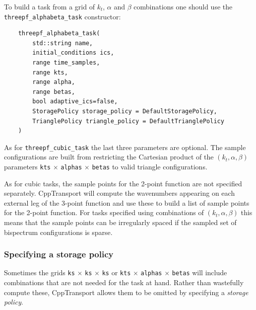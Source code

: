 \documentclass[11pt,a4paper]{article}
\newcommand{\packagefont}{\sffamily}
\newcommand{\CppTransport}{{\packagefont CppTransport}}
\begin{document}
To build a task from a grid of $k_t$, $\alpha$ and $\beta$ combinations one should use
the \texttt{threepf_alphabeta_task} constructor:
\begin{verbatim}
    threepf_alphabeta_task(
        std::string name,
        initial_conditions ics,
        range time_samples,
        range kts,
        range alpha,
        range betas,
        bool adaptive_ics=false,
        StoragePolicy storage_policy = DefaultStoragePolicy,
        TrianglePolicy triangle_policy = DefaultTrianglePolicy
    )    
\end{verbatim}
As for \texttt{threepf_cubic_task} the last three parameters are optional.
The sample configurations are built from restricting the Cartesian product
of the $(k_t, \alpha, \beta)$ parameters
\texttt{kts} $\times$ \texttt{alphas} $\times$ \texttt{betas}
to valid triangle configurations.

As for cubic tasks, the sample points for the 2-point function are not specified separately.
{\CppTransport} will compute the wavenumbers appearing on each external leg of the
3-point function and use these to build a list of sample points for the 2-point function.
For tasks specified using combinations of $(k_t, \alpha, \beta)$ this means that the sample
points can be irregularly spaced if the sampled set of bispectrum configurations
is sparse.

\subsubsection{Specifying a storage policy}
\label{sec:storage-policy}
Sometimes the grids
\texttt{ks} $\times$ \texttt{ks} $\times$ \texttt{ks}
or
\texttt{kts} $\times$ \texttt{alphas} $\times$ \texttt{betas}
will include combinations that are not needed for the task at hand.
Rather than wastefully compute these, {\CppTransport} allows them to be omitted by
specifying a \emph{storage policy}.
\end{document}
